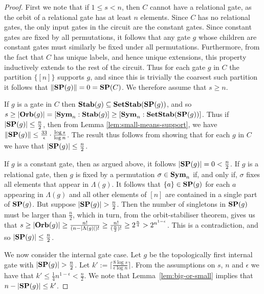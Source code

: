 \documentclass[../paper.tex]{subfiles}
\begin{document}
\begin{proof}
  First we note that if $1 \leq s < n$, then $C$ cannot have a relational gate,
  as the orbit of a relational gate has at least $n$ elements. Since $C$ has no
  relational gates, the only input gates in the circuit are the constant gates.
  Since constant gates are fixed by all permutations, it follows that any gate
  $g$ whose children are constant gates must similarly be fixed under all
  permutations. Furthermore, from the fact that $C$ has unique labels, and hence
  unique extensions, this property inductively extends to the rest of the
  circuit. Thus for each gate $g$ in $C$ the partition $\{[n]\}$ supports $g$,
  and since this is trivially the coarsest such partition it follows that $\|
  \text{\textbf{SP}}(g) \| = 0 = \text{\textbf{SP}}(C)$. We therefore assume that $s \geq n$.

  If $g$ is a gate in $C$ then $\text{\textbf{Stab}} (g) \subseteq \text{\textbf{SetStab}}(\text{\textbf{SP}}(g))$, and so $s
  \geq \vert \text{\textbf{Orb}}(g) \vert = [\text{\textbf{Sym}}_n : \text{\textbf{Stab}}(g)] \geq [\text{\textbf{Sym}}_n :
  \text{\textbf{SetStab}}(\text{\textbf{SP}}(g))]$. Thus if $\vert \text{\textbf{SP}}(g) \vert \leq \frac{n}{2}$, then from
  Lemma \ref{lem:small-means-support}, we have $\| \text{\textbf{SP}} (g) \| \leq
  \frac{33}{\epsilon} \cdot \frac{\log s} {\log n}$. The result thus follows
  from showing that for each $g$ in $C$ we have that $\vert \text{\textbf{SP}} (g) \vert \leq
  \frac{n}{2}$.
  
  If $g$ is a constant gate, then as argued above, it follows $\vert \text{\textbf{SP}}(g)
  \vert = 0 < \frac{n}{2}$. If $g$ is a relational gate, then $g$ is fixed by a
  permutation $\sigma \in \text{\textbf{Sym}}_n$ if, and only if, $\sigma$ fixes all elements
  that appear in $\Lambda(g)$. It follows that $\{a\} \in \text{\textbf{SP}}(g)$ for each $a$
  appearing in $\Lambda(g)$ and all other elements of $[n]$ are contained in a
  single part of $\text{\textbf{SP}}(g)$. But suppose $\vert \text{\textbf{SP}}(g) \vert > \frac{n}{2}$. Then
  the number of singletons in $\text{\textbf{SP}}(g)$ must be larger than $\frac{n}{2}$, which
  in turn, from the orbit-stabiliser theorem, gives us that $ s \geq \vert \text{\textbf{Orb}}
  (g) \vert \geq \frac{n!}{(n-\vert \Lambda (g) \vert)!} \geq
  \frac{n!}{{(\frac{n}{2}})!} \geq 2^{\frac{n}{4}} > 2^{n^{1- \epsilon}} $. This
  is a contradiction, and so $\vert \text{\textbf{SP}}(g) \vert \leq \frac{n}{2}$.

  We now consider the internal gate case. Let $g$ be the topologically first
  internal gate with $\vert \text{\textbf{SP}}(g) \vert > \frac{n}{2}$. Let $k' := \lceil
  \frac{8 \log s}{\epsilon \log n} \rceil$. From the assumptions on $s$, $ n$
  and $\epsilon$ we have that $k' \leq \frac{1}{4}n^{1-\epsilon} < \frac{n}{2}$.
  We note that Lemma~\ref{lem:big-or-small} implies that $n - \vert \text{\textbf{SP}}(g) \vert
  \leq k'$.
  

\end{proof}
\end{document}
